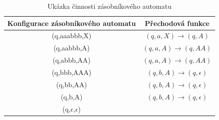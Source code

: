 \begin{table}[h]
    \centering
    \begin{tabular}{c|c}
        Konfigurace zásobníkového automatu & Přechodová funkce \\
        \hline
        (q,aaabbb,X) & $(q,a,X) \rightarrow (q,A)$ \\
        (q,aabbb,A) & $(q,a,A) \rightarrow (q,AA)$ \\
        (q,abbb,AA) & $(q,a,A) \rightarrow (q,AA)$ \\
        (q,bbb,AAA) & $(q,b,A) \rightarrow (q,\epsilon)$ \\
        (q,bb,AA) & $(q,b,A) \rightarrow (q,\epsilon)$ \\
        (q,b,A) & $(q,b,A) \rightarrow (q,\epsilon)$ \\
        (q,$\epsilon$,$\epsilon$) &  \\
    \end{tabular}
    \caption{Ukázka činnosti zásobníkového automatu }\label{tab:DemonstationOfPDA}
\end{table}

\endinput